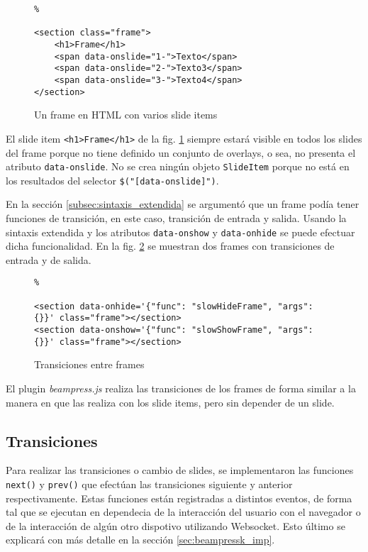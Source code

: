 			\begin{figure}[htb]%
				\begin{lstlisting}%

<section class="frame">
	<h1>Frame</h1>
	<span data-onslide="1-">Texto</span>
	<span data-onslide="2-">Texto3</span>
	<span data-onslide="3-">Texto4</span>
</section>
				\end{lstlisting}
				\caption{Un frame en HTML con varios slide items}
				\label{fig:frame_html_slides}
			\end{figure}

			El slide item \texttt{<h1>Frame</h1>} de la fig. \ref{fig:frame_html_slides} siempre estará visible en todos los slides del frame porque no tiene definido un conjunto de overlays, o sea, no presenta el atributo \texttt{data-onslide}. No se crea ningún objeto \texttt{SlideItem} porque no está en los resultados del selector \texttt{\$("[data-onslide]")}.


			En la sección \ref{subsec:sintaxis_extendida} se argumentó que un frame podía tener funciones de transición, en este caso, transición de entrada y salida. Usando la sintaxis extendida y los atributos \texttt{data-onshow} y \texttt{data-onhide} se puede efectuar dicha funcionalidad. En la fig. \ref{fig:frames_transitions} se muestran dos frames con transiciones de entrada y de salida.


		\begin{figure}[htb]%
			\begin{lstlisting}%

<section data-onhide='{"func": "slowHideFrame", "args": {}}' class="frame"></section>
<section data-onshow='{"func": "slowShowFrame", "args": {}}' class="frame"></section>
			\end{lstlisting}
		\caption{Transiciones entre frames}
		\label{fig:frames_transitions}
		\end{figure}	

		El plugin \textit{beampress.js} realiza las transiciones de los frames de forma similar a la manera en que las realiza con los slide items, pero sin depender de un slide.

		\subsection{Transiciones} %
		\label{sub:transiciones}
			Para realizar las transiciones o cambio de slides, se implementaron las funciones \texttt{next()} y \texttt{prev()} que efectúan las transiciones siguiente y anterior respectivamente. Estas funciones están registradas a distintos eventos, de forma tal que se ejecutan en dependecia de la interacción del usuario con el navegador o de la interacción de algún otro dispotivo utilizando Websocket. Esto último se explicará con más detalle en la sección \ref{sec:beampressk_imp}.

